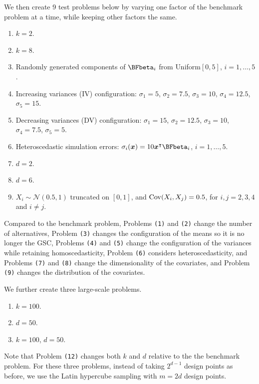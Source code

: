 \documentclass[ijoc,nonblindrev]{informs3}
\def\Cov{{\rm Cov}}
\def\bx{{\bm x}}
\def\cN{{\mathcal N}}
\begin{document}
We then create 9 test problems below by varying one factor of the benchmark problem at a time, while keeping other factors the same.
\begin{enumerate}[label=\texttt{(\arabic*)}]
\item
$k=2$.
 \item
$k=8$.
\item
Randomly generated components of $\BFbeta_i$ from \textsf{Uniform}$[0,5]$, $i=1,\ldots,5$.
\item
Increasing variances (IV) configuration: $\sigma_1=5$, $\sigma_2=7.5$, $\sigma_3=10$, $\sigma_4=12.5$, $\sigma_5=15$.
\item
Decreasing variances (DV) configuration: $\sigma_1=15$, $\sigma_2=12.5$, $\sigma_3=10$, $\sigma_4=7.5$, $\sigma_5=5$.
\item
Heteroscedastic simulation errors: $\sigma_i(\bx)=10  \bx^\intercal \BFbeta_i $, $i=1,\ldots,5$.
\item
$d=2$.
\item
$d=6$.
\item
$X_i \sim \cN(0.5,1)$ truncated on $[0,1]$, and $\Cov(X_i, X_j)=0.5$, for $i,j=2,3,4$ and $i\neq j$.
\end{enumerate}
Compared to the benchmark problem, Problems \texttt{(1)} and \texttt{(2)} change the number of alternatives,
Problem \texttt{(3)} changes the configuration of the means so it is no longer the GSC,
Problems \texttt{(4)} and \texttt{(5)} change the configuration of the variances while retaining homoscedasticity,
Problem \texttt{(6)} considers heteroscedasticity, and Problems \texttt{(7)} and \texttt{(8)} change the dimensionality of the covariates,
and Problem \texttt{(9)} changes the distribution of the covariates.


We further create three large-scale problems.
\begin{enumerate}[label=\texttt{(\arabic*)}, resume]
  \item  $k=100$.
  \item $d=50$.
  \item $k=100$, $d=50$.
\end{enumerate}
Note that Problem \texttt{(12)} changes both $k$ and  $d$ relative to the the benchmark problem.
For these three problems, instead of taking $2^{d-1}$ design points as before, we use the Latin hypercube sampling with $m=2d$ design points.
\end{document}
